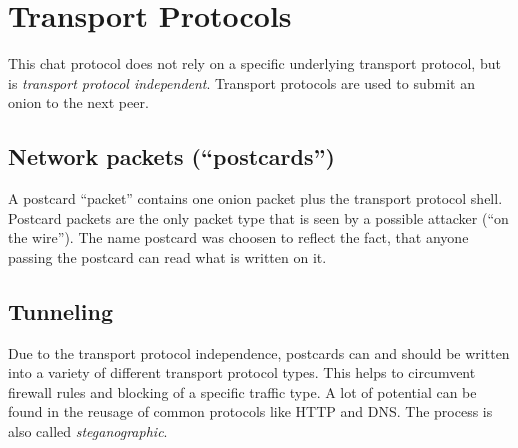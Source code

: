 \section{Transport Protocols}
This chat protocol does not rely on a specific underlying transport protocol,
but is \textit{transport protocol independent}. 
Transport protocols are used to submit an onion to the next peer.

\subsection{Network packets ("`postcards"')}
\label{eofpostcard}
A postcard "`packet"' contains one onion packet plus the transport protocol
shell. Postcard packets are the only packet type that is seen by a possible
attacker ("`on the wire"'). 
The name postcard was choosen to reflect the fact, that anyone
passing the postcard can read what is written on it.
\subsection{Tunneling}
\label{tunneling}
Due to the transport protocol independence, postcards can and should
be written into a variety of different transport protocol types.
This helps to circumvent firewall rules and blocking of a specific
traffic type. A lot of potential can be found in the reusage of
common protocols like HTTP and DNS.\cite{rfc1034, rfc1035, rfc2616}
The process is also called \textit{steganographic}.
